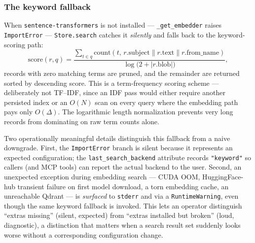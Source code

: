 \subsubsection{The keyword fallback}
\label{sec:keyword-fallback}

When \texttt{sentence-transformers} is not installed —
\texttt{\_get\_embedder} raises \texttt{ImportError} —
\texttt{Store.search} catches it \emph{silently} and falls back to the
keyword-scoring path:
\[
\mathrm{score}(r, q) = \frac{\sum_{t \in q} \mathrm{count}(t,\, r.\text{subject} \parallel r.\text{text} \parallel r.\text{from\_name})}{\log\bigl(2 + |r.\text{blob}|\bigr)},
\]
records with zero matching terms are pruned, and the remainder are
returned sorted by descending score. This is a term-frequency scoring
scheme — deliberately not TF--IDF, since an IDF pass would either
require another persisted index or an $O(N)$ scan on every query
where the embedding path pays only $O(\Delta)$. The logarithmic
length normalization prevents very long records from dominating on
raw term counts alone.

Two operationally meaningful details distinguish this fallback from a
naive downgrade. First, the \texttt{ImportError} branch is silent
because it represents an expected configuration; the
\texttt{last\_search\_backend} attribute records
\texttt{"keyword"} so callers (and MCP tools) can report the actual
backend to the user. Second, an unexpected exception during embedding
search — CUDA OOM, HuggingFace-hub transient failure on first model
download, a torn embedding cache, an unreachable Qdrant — is
\emph{surfaced} to \texttt{stderr} and via a \texttt{RuntimeWarning},
even though the same keyword fallback is invoked. This lets an
operator distinguish ``extras missing'' (silent, expected) from
``extras installed but broken'' (loud, diagnostic), a distinction that
matters when a search result set suddenly looks worse without a
corresponding configuration change.

